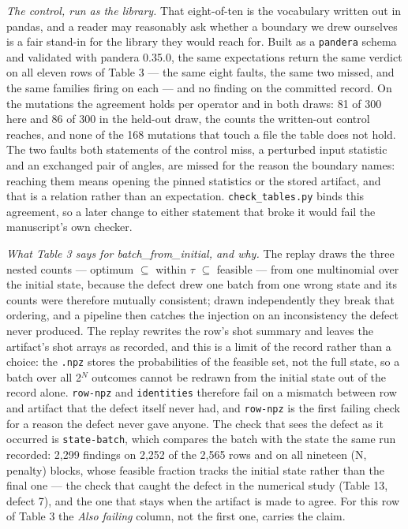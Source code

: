 \documentclass[acmsmall,screen,review]{acmart}
\begin{document}
\textit{The control, run as the library.} That eight-of-ten is the vocabulary written out in pandas, and a reader may reasonably ask whether a boundary we drew ourselves is a fair stand-in for the library they would reach for. Built as a \texttt{pandera} schema and validated with pandera 0.35.0, the same expectations return the same verdict on all eleven rows of Table 3 --- the same eight faults, the same two missed, and the same families firing on each --- and no finding on the committed record. On the mutations the agreement holds per operator and in both draws: 81 of 300 here and 86 of 300 in the held-out draw, the counts the written-out control reaches, and none of the 168 mutations that touch a file the table does not hold. The two faults both statements of the control miss, a perturbed input statistic and an exchanged pair of angles, are missed for the reason the boundary names: reaching them means opening the pinned statistics or the stored artifact, and that is a relation rather than an expectation. \texttt{check\_tables.py} binds this agreement, so a later change to either statement that broke it would fail the manuscript's own checker.


\textit{What Table 3 says for batch\_from\_initial, and why.} The replay draws the three nested counts --- optimum $\subseteq$ within $\tau$ $\subseteq$ feasible --- from one multinomial over the initial state, because the defect drew one batch from one wrong state and its counts were therefore mutually consistent; drawn independently they break that ordering, and a pipeline then catches the injection on an inconsistency the defect never produced. The replay rewrites the row's shot summary and leaves the artifact's shot arrays as recorded, and this is a limit of the record rather than a choice: the \texttt{.npz} stores the probabilities of the feasible set, not the full state, so a batch over all 2$^{N}$ outcomes cannot be redrawn from the initial state out of the record alone. \texttt{row-npz} and \texttt{identities} therefore fail on a mismatch between row and artifact that the defect itself never had, and \texttt{row-npz} is the first failing check for a reason the defect never gave anyone. The check that sees the defect as it occurred is \texttt{state-batch}, which compares the batch with the state the same run recorded: 2,299 findings on 2,252 of the 2,565 rows and on all nineteen (N, penalty) blocks, whose feasible fraction tracks the initial state rather than the final one --- the check that caught the defect in the numerical study (Table 13, defect 7), and the one that stays when the artifact is made to agree. For this row of Table 3 the \textit{Also failing} column, not the first one, carries the claim.
\end{document}
